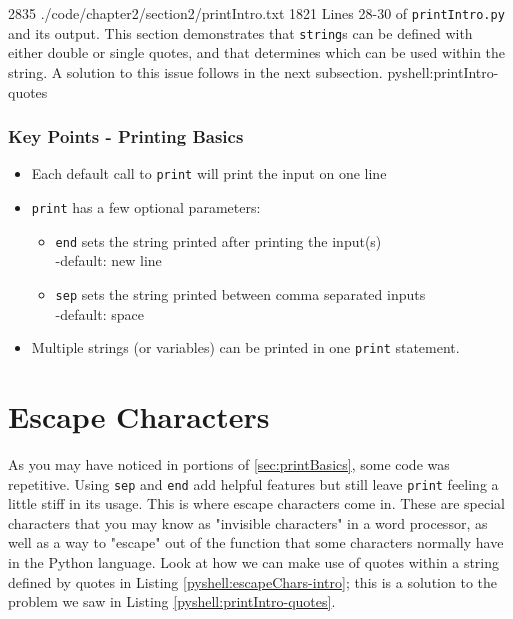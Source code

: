 \documentclass[oneside]{book}
\begin{document}
{28}{35}
{./code/chapter2/section2/printIntro.txt}
{18}{21}
{Lines 28-30 of \texttt{printIntro.py} and its output. This section demonstrates that \texttt{string}s can be defined with either double or single quotes, and that determines which can be used within the string. A solution to this issue follows in the next subsection.}
{pyshell:printIntro-quotes}

\FloatBarrier

\subsubsection*{Key Points - Printing Basics}
\begin{itemize}
    \item Each default call to \texttt{print} will print the input on one line
    \item \texttt{print} has a few optional parameters: 
    \begin{itemize}
        \item \texttt{end} sets the string printed after printing the input(s)\\-default: new line
        \item \texttt{sep} sets the string printed between comma separated inputs\\-default: space
    \end{itemize}
    \item Multiple strings (or variables) can be printed in one \texttt{print} statement. 
\end{itemize}

\section{Escape Characters}\label{sec:escapeChars}

As you may have noticed in portions of \ref{sec:printBasics}, some code was repetitive. Using \texttt{sep} and \texttt{end} add helpful features but still leave \texttt{print} feeling a little stiff in its usage. This is where escape characters come in. These are special characters that you may know as "invisible characters" in a word processor, as well as a way to "escape" out of the function that some characters normally have in the Python language. Look at how we can make use of quotes within a string defined by quotes in Listing \ref{pyshell:escapeChars-intro}; this is a solution to the problem we saw in Listing \ref{pyshell:printIntro-quotes}.
 
\end{document}
